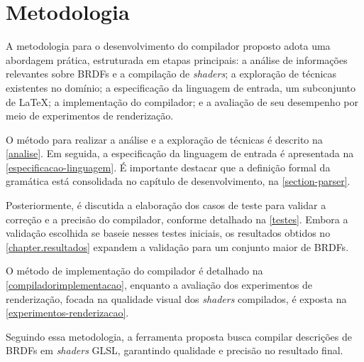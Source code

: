 \chapter{Metodologia} \label{metodologia}

A metodologia para o desenvolvimento do compilador proposto adota uma abordagem prática, estruturada em etapas principais: a análise de informações relevantes sobre BRDFs e a compilação de \textit{shaders}; a exploração de técnicas existentes no domínio; a especificação da linguagem de entrada, um subconjunto de \LaTeX{}; a implementação do compilador; e a avaliação de seu desempenho por meio de experimentos de renderização.

O método para realizar a análise e a exploração de técnicas é descrito na \autoref{analise}. Em seguida, a especificação da linguagem de entrada é apresentada na \autoref{especificacao-linguagem}. É importante destacar que a definição formal da gramática está consolidada no capítulo de desenvolvimento, na \autoref{section-parser}.

Posteriormente, é discutida a elaboração dos casos de teste para validar a correção e a precisão do compilador, conforme detalhado na \autoref{testes}. Embora a validação escolhida se baseie nesses testes iniciais, os resultados obtidos no \autoref{chapter.resultados} expandem a validação para um conjunto maior de BRDFs.

O método de implementação do compilador é detalhado na \autoref{compiladorimplementacao}, enquanto a avaliação dos experimentos de renderização, focada na qualidade visual dos \textit{shaders} compilados, é exposta na \autoref{experimentos-renderizacao}.


Seguindo essa metodologia, a ferramenta proposta busca compilar descrições de BRDFs em \textit{shaders} GLSL, garantindo qualidade e precisão no resultado final.




